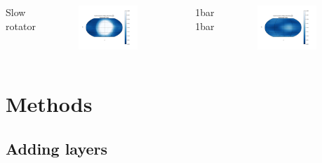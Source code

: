 \documentclass{beamer}
\begin{document}
\begin{frame}
\begin{columns}
        {\tiny Slow rotator}
        \begin{figure}[topsep=0pt, partopsep=0pt]
        \includegraphics[width=0.8\textwidth]{models/slow_rotator_cloud_map.png}
        \end{figure}
        \vspace{-2EM}
        {\tiny 1bar 1bar}
        \begin{figure}
        \includegraphics[width=0.8\textwidth]{models/hot_cloud_map.png}
        \end{figure}
    \end{columns}
\end{frame}

\section{Methods}
\subsection{Adding layers}
\end{document}

